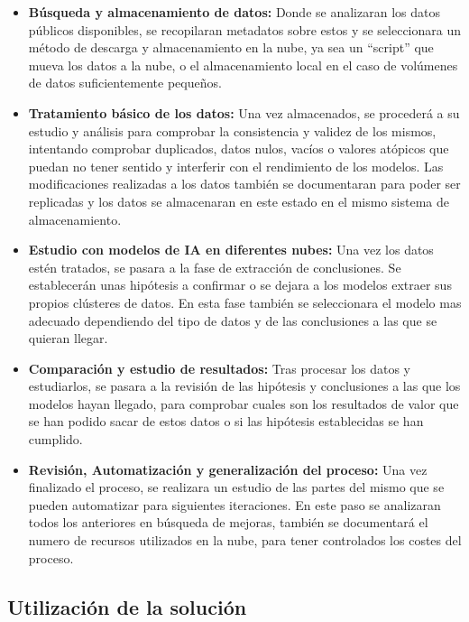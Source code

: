 \begin{itemize}
	\item \textbf{ Búsqueda y almacenamiento de datos:} Donde se analizaran los datos públicos disponibles, se recopilaran metadatos sobre estos y se seleccionara un método de descarga y almacenamiento en la nube, ya sea un ``script'' que mueva los datos a la nube, o el almacenamiento local en el caso de volúmenes de datos suficientemente pequeños. \\
	\item \textbf{ Tratamiento básico de los datos:} Una vez almacenados, se procederá a su estudio y análisis para comprobar la consistencia y validez de los mismos, intentando comprobar duplicados, datos nulos, vacíos o valores atópicos que puedan no tener sentido y interferir con el rendimiento de los modelos. Las modificaciones realizadas a los datos también se documentaran para poder ser replicadas y los datos se almacenaran en este estado en el mismo sistema de almacenamiento. \\
	\item \textbf{ Estudio con modelos de IA en diferentes nubes:} Una vez los datos estén tratados, se pasara a la fase de extracción de conclusiones. Se establecerán unas hipótesis a confirmar o se dejara a los modelos extraer sus propios clústeres de datos. En esta fase también se seleccionara el modelo mas adecuado dependiendo del tipo de datos y de las conclusiones a las que se quieran llegar.
	\item \textbf{ Comparación y estudio de resultados:} Tras procesar los datos y estudiarlos, se pasara a la revisión de las hipótesis y conclusiones a las que los modelos hayan llegado, para comprobar cuales son los resultados de valor que se han podido sacar de estos datos o si las hipótesis establecidas se han cumplido.
	\item \textbf{ Revisión, Automatización y generalización del proceso:} Una vez finalizado el proceso, se realizara un estudio de las partes del mismo que se pueden automatizar para siguientes iteraciones. En este paso se analizaran todos los anteriores en búsqueda de mejoras, también se documentará el numero de recursos utilizados en la nube, para tener controlados los costes del proceso.
\end{itemize}

\subsection{Utilización de la solución}


